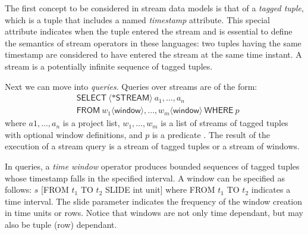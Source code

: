 The first concept to be considered in stream data models is that of a \textit{tagged tuple}, which is a tuple that
includes a named \textit{timestamp} attribute. This special attribute indicates when the tuple entered the stream and
is essential to define the semantics of stream operators in these languages: two tuples having the same timestamp are
considered to have entered the stream at the same time instant. A stream is a potentially infinite sequence of tagged
tuples.

Next we can move into \emph{queries}. Queries over streams are of the form:
\begin{align*}
&\mathsf{SELECT}\ \langle\mathsf{*STREAM}\rangle\ a_1,\ldots ,a_n\  \\ &\mathsf{FROM}\ w_1 \langle \mathsf{window} \rangle,\ldots,w_m \langle \mathsf{window} \rangle\ \mathsf{WHERE}\ p 
\end{align*}
where $a1, \ldots ,a_n$ is a project list, $w_1, \ldots , w_m$ is a list of streams of tagged tuples with optional
window definitions, and $p$ is a predicate \cite{Arasu_2006,Brenninkmeijer_08}. The result of the execution of a stream
query is a stream of tagged tuples or a stream of windows.

In queries, a \emph{time window} operator produces bounded sequences of tagged tuples whose timestamp falls in the
specified interval. A window can be specified as follows: $s$ \textsf{[FROM} $t_1$ \textsf{TO} $t_2$ \textsf{SLIDE int
unit]} where \textsf{FROM} $t_1$ \textsf{TO} $t_2$ indicates a time interval. The slide parameter indicates the
frequency of the window creation in time units or rows.
Notice that windows are not only time dependant, but may also be tuple (row) dependant.

